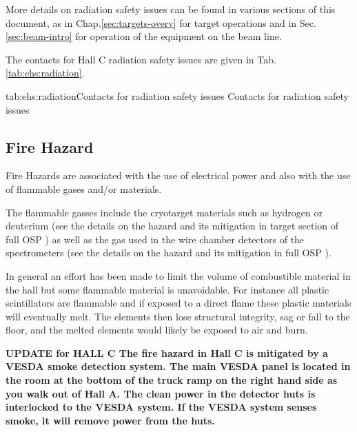  More details on radiation safety issues can be found in various sections of this 
 document, as in Chap.\ref{sec:targets-overv} for target operations and
 in Sec.\ref{sec:beam-intro} for operation of the equipment on the beam line.
 
 The contacts for Hall C radiation safety issues are given in Tab.\ref{tab:ehs:radiation}.
 
 \begin{namestab}{tab:ehs:radiation}{Contacts for radiation safety issues}{%
   Contacts for radiation safety issues}
 \end{namestab}


\begin{safetyen}{0}{0}
\section{Fire Hazard} 
\label{sec:firehazard}
\end{safetyen}

 Fire Hazards are associated with the use of electrical power and also with the use of 
 flammable gases and/or materials. 

 The flammable gasses include the cryotarget
 materials such as hydrogen or deuterium 
 (see the details on the hazard and its mitigation in target section of full OSP ) as well as
 the gas used in the wire chamber detectors of the spectrometers 
 (see the details on the hazard and its mitigation in full OSP ).
 
 In general an effort has been made to limit the volume of combustible material 
 in the hall but some flammable material is unavoidable. For instance all plastic 
 scintillators are flammable and if exposed to a direct flame these 
 plastic materials will eventually melt. The elements then lose structural integrity, 
 sag or fall to the floor, and the melted elements would likely be exposed to air and burn.

 
\textbf{
UPDATE for HALL C
The fire hazard in Hall C is mitigated by a VESDA smoke detection system. 
 The main VESDA panel is located in the room at the bottom of the truck ramp on the 
 right hand side as you walk out of Hall A. The clean power in the detector huts is 
 interlocked to the VESDA system. If the VESDA system senses smoke, it will remove power 
 from the huts.
}

